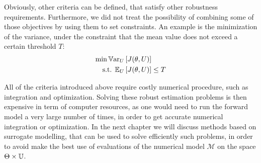 \documentclass[../../Main_ManuscritThese.tex]{subfiles}
\begin{document}
Obviously, other criteria can be defined, that satisfy other robustness requirements.
Furthermore, we did not treat the possibility of combining some of those objectives by using them to set constraints. An example is the minimization of  the variance, under the constraint that the mean value does not exceed a certain threshold $T$:
\begin{align*}
  \min \mathbb{V}\mathrm{ar}_{U}&\left[J(\theta, U)\right]  \\
  \text{s.t. } \mathbb{E}_{U}&\left[J(\theta, U)\right]   \leq T
\end{align*}

All of the criteria introduced above require costly numerical procedure, such as integration and optimization. Solving these robust estimation problems is then expensive in term of computer resources, as one would need to run the forward model a very large number of times, in order to get accurate numerical integration or optimization. In the next chapter we will discuss methods based on surrogate modelling, that can be used to solve efficiently such problems, in order to avoid make the best use of evaluations of the numerical model $\mathcal{M}$ on the space $\Theta \times\mathbb{U}$. 

\subfileLocal{
	\pagestyle{empty}
	
	
      }
\end{document}
